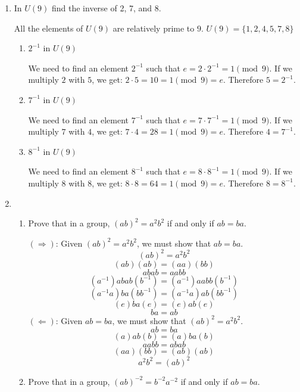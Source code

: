 \documentclass{article}
\begin{document}
\begin{enumerate}
\item In $U(9)$ find the inverse of 2, 7, and 8.
\begin{flushleft}
All the elements of $U(9)$ are relatively prime to $9$. $U(9) = \{1, 2, 4, 5, 7, 8\}$
\end{flushleft}
    \begin{enumerate}
        \item $2^{-1}$ in $U(9)$
        \begin{flushleft}
        We need to find an element $2^{-1}$ such that $e = 2 \cdot 2^{-1} = 1\pmod{9}$. If we multiply $2$ with $5$, we get: $2 \cdot 5 = 10 = 1\pmod{9} = e$. Therefore $5 = 2^{-1}$.
        \end{flushleft}
        \item $7^{-1}$ in $U(9)$
        \begin{flushleft}
        We need to find an element $7^{-1}$ such that $e = 7 \cdot 7^{-1} = 1\pmod{9}$. If we multiply $7$ with $4$, we get: $7 \cdot 4 = 28 = 1 \pmod{9} = e$. Therefore $4 = 7^{-1}$.
        \end{flushleft}
        \item $8^{-1}$ in $U(9)$
        \begin{flushleft}
        We need to find an element $8^{-1}$ such that $e = 8 \cdot 8^{-1} = 1\pmod{9}$. If we multiply $8$ with $8$, we get: $8 \cdot 8 = 64 = 1\pmod{9} = e$. Therefore $8 = 8^{-1}$.
        \end{flushleft}
    \end{enumerate}
\newpage
\item
    \begin{enumerate}
        \item Prove that in a group, $(ab)^2 = a^2b^2$ if and only if $ab = ba$.
        \begin{flushleft}
        $(\Rightarrow)$: Given $(ab)^2 = a^2b^2$, we must show that $ab = ba$.
        $$(ab)^2 = a^2b^2$$
        $$(ab)(ab) = (aa)(bb)$$
        $$abab = aabb$$
        $$(a^{-1})abab(b^{-1}) = (a^{-1})aabb(b^{-1})$$
        $$(a^{-1}a)ba(bb^{-1}) = (a^{-1}a)ab(bb^{-1})$$
        $$(e)ba(e) = (e)ab(e)$$
        $$ba = ab$$
        $(\Leftarrow)$: Given $ab = ba$, we must show that $(ab)^2 = a^2b^2$.
        $$ab = ba$$
        $$(a)ab(b) = (a)ba(b)$$
        $$aabb = abab$$
        $$(aa)(bb) = (ab)(ab)$$
        $$a^2b^2 = (ab)^2$$
        \end{flushleft}
        \item Prove that in a group, $(ab)^{-2} = b^{-2}a^{-2}$ if and only if $ab = ba$.

\end{enumerate}
\end{enumerate}
\end{document}
